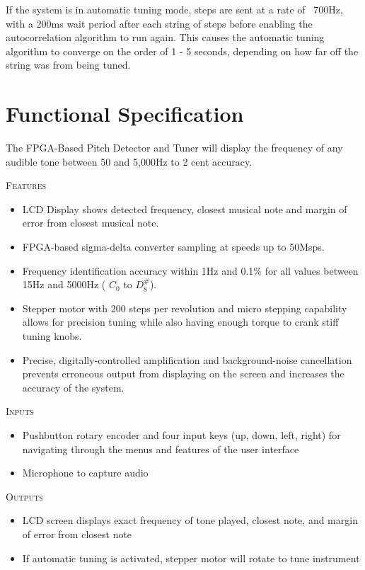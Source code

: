 \documentclass[aps,letterpaper,10pt]{revtex4}
\begin{document}
If the system is in automatic tuning mode, steps are sent at a rate of ~700Hz, with a 200ms wait period after each string of steps before enabling the autocorrelation algorithm to run again. This causes the automatic tuning algorithm to converge on the order of 1 - 5 seconds, depending on how far off the string was from being tuned. 

\section{Functional Specification}
The FPGA-Based Pitch Detector and Tuner will display the frequency of any audible tone between 50 and 5,000Hz to 2 cent accuracy. 

\noindent \textsc{\large Features}\\

\begin{itemize}
\item LCD Display shows detected frequency, closest musical note and margin of error from closest musical note. 
\item FPGA-based sigma-delta converter sampling at speeds up to 50Msps.
\item Frequency identification accuracy within 1Hz and 0.1\% for all values between 15Hz and 5000Hz ( $C_0$ to $D^\#_8$).
\item Stepper motor with 200 steps per revolution and micro stepping capability allows for precision tuning while also having enough torque to crank stiff tuning knobs. 
\item Precise, digitally-controlled amplification and background-noise cancellation prevents erroneous output from displaying on the screen and increases the accuracy of the system.
\end{itemize}

\noindent \textsc{\large Inputs}\\

\begin{itemize}
\item Pushbutton rotary encoder and four input keys (up, down, left, right) for navigating through the menus and features of the user interface
\item Microphone to capture audio
\end{itemize}

\noindent \textsc{\large Outputs}\\

\begin{itemize}
\item LCD screen displays exact frequency of tone played, closest note, and margin of error from closest note
\item If automatic tuning is activated, stepper motor will rotate to tune instrument
\end{itemize}
\end{document}
